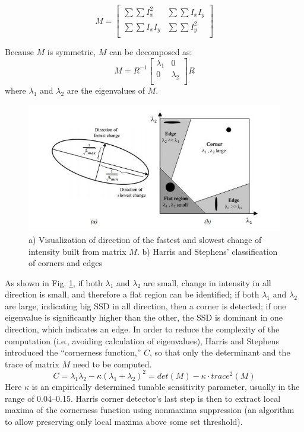 \documentclass[twoside]{article}
\begin{document}
\begin{equation}
M =
\begin{bmatrix}
\sum \sum I_x^2 & \sum \sum I_x I_y \\
\sum \sum I_x I_y & \sum \sum I_y^2 \\
\end{bmatrix}
\end{equation}

Because $M$ is symmetric, $M$ can be decomposed as:
\begin{equation}
M =
R^{-1}
\begin{bmatrix}
\lambda_1 & 0\\
0 & \lambda_2\\
\end{bmatrix}
R
\end{equation}
where $\lambda_1$ and $\lambda_2$ are the eigenvalues of $M$. 
\begin{figure}
	\centering
	\includegraphics{harris.JPG}
    \caption{a) Visualization of direction of the fastest and slowest change of intensity built from matrix $M$. b) Harris and Stephens' classification of corners and edges \cite{SNS}}
    \label{harris}
\end{figure}

As shown in Fig. \ref{harris}, if both $\lambda_1$ and $\lambda_2$ are small, change in intensity in all direction is small, and therefore a flat region can be identified; if both $\lambda_1$ and $\lambda_2$ are large, indicating big SSD in all direction, then a corner is detected; if one eigenvalue is significantly higher than the other, the SSD is dominant in one direction, which indicates an edge. In order to reduce the complexity of the computation (i.e., avoiding calculation of eigenvalues), Harris and Stephens introduced the ``cornerness function,'' $C$, so that only the determinant and the trace of matrix $M$ need to be computed. 
\begin{equation}
C = \lambda_1 \lambda_2 - \kappa(\lambda_1+\lambda_2)^2 = det(M) - \kappa\cdot trace^2(M)
\end{equation}
Here $\kappa$ is an empirically determined tunable sensitivity parameter, usually in the range of 0.04--0.15. Harris corner detector's last step is then to extract local maxima of the cornerness function using nonmaxima suppression (an algorithm to allow preserving only local maxima above some set threshold). \\
\end{document}
